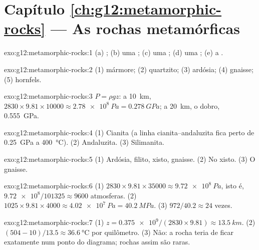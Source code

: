 \section*{Capítulo \ref{ch:g12:metamorphic-rocks} --- As rochas metamórficas}

\begin{solution}{exo:g12:metamorphic-rocks:1}
(a) ; (b) uma ; (c) uma ; (d) uma ;
(e) a .
\end{solution}

\begin{solution}{exo:g12:metamorphic-rocks:2}
(1) mármore; (2) quartzito; (3) ardósia; (4) gnaisse; (5) hornfels.
\end{solution}

\begin{solution}{exo:g12:metamorphic-rocks:3}
$P = \rho g z$: a \qty{10}{km}, $2830 \times 9.81 \times \num{10000} \approx
\qty{2.78e8}{Pa} = \qty{0.278}{GPa}$; a \qty{20}{km}, o dobro,
\qty{0.555}{GPa}.
\end{solution}

\begin{solution}{exo:g12:metamorphic-rocks:4}
(1) Cianita (a linha cianita--andaluzita fica perto de \qty{0.25}{GPa} a
\qty{400}{\celsius}). (2) Andaluzita. (3) Silimanita.
\end{solution}

\begin{solution}{exo:g12:metamorphic-rocks:5}
(1) Ardósia, filito, xisto, gnaisse. (2) No xisto. (3) O gnaisse.
\end{solution}

\begin{solution}{exo:g12:metamorphic-rocks:6}
(1) $2830 \times 9.81 \times \num{35000} \approx \qty{9.72e8}{Pa}$, isto é,
$\num{9.72e8}/101325 \approx \num{9600}$ atmosferas. (2) $1025 \times 9.81
\times 4000 \approx \qty{4.02e7}{Pa} = \qty{40.2}{MPa}$. (3) $972/40.2
\approx 24$ vezes.
\end{solution}

\begin{solution}{exo:g12:metamorphic-rocks:7}
(1) $z = \num{0.375e9}/(2830 \times 9.81) \approx \qty{13.5}{km}$.
(2) $(504 - 10)/13.5 \approx \qty{36.6}{\celsius}$ por quilômetro. (3) Não:
a rocha teria de ficar exatamente num ponto do diagrama; rochas assim são
raras.
\end{solution}

